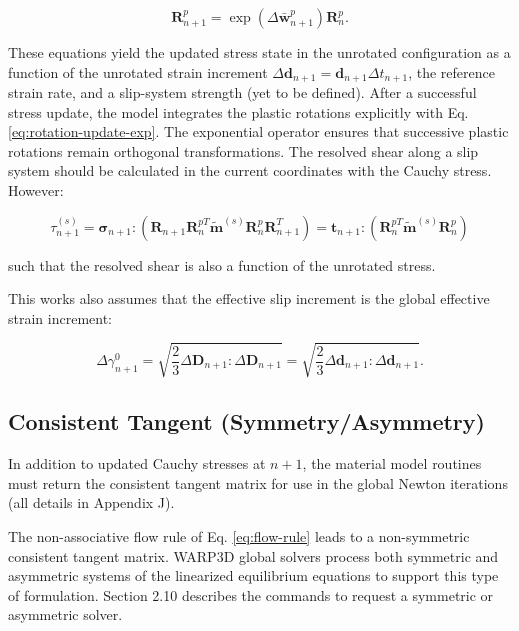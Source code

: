 \documentclass[11pt]{report}
\numberwithin{equation}{section}
\newcommand{\noi}{\noindent}
\newcommand{\eedit}{\color{black}}
\begin{document}
\begin{equation}
\mathbf{R}_{n+1}^{p}=\exp\left(\Delta\bar{\mathbf{w}}_{n+1}^{p}\right)\mathbf{R}_{n}^{p}.\label{eq:rotation-update-exp}
\end{equation}

These equations yield the updated stress state in the unrotated configuration
as a function of the unrotated strain increment 
$\Delta\mathbf{d}_{n+1}=\mathbf{d}_{n+1}\Delta t_{n+1}$,
the reference strain rate, and a slip-system strength (yet to be defined).
After a successful stress update, the model integrates the plastic
rotations explicitly with Eq. \ref{eq:rotation-update-exp}.
The exponential
operator ensures that successive plastic rotations remain orthogonal
transformations.
The resolved shear along a slip system should be
calculated in the current coordinates with the Cauchy stress. 
However:

\[
\tau_{n+1}^{\left(s\right)}=
\bm{\sigma}_{n+1}:\left(\mathbf{R}_{n+1}\mathbf{R}_{n}^{pT}
\tilde{\mathbf{m}}^{\left(s\right)}\mathbf{R}_{n}^{p}\mathbf{R}_{n+1}^{T}\right)=
\mathbf{t}_{n+1}:\left(\mathbf{R}_{n}^{pT}\tilde{\mathbf{m}}^{\left(s\right)}\mathbf{R}_{n}^{p}\right)
\]

\noi such that the resolved shear is also a function of the unrotated stress.

This works also assumes that the effective slip increment is the global effective
strain increment:

\begin{equation}
\Delta\gamma_{n+1}^{0}=
\sqrt{\frac{2}{3}\Delta\mathbf{D}_{n+1}:\Delta\mathbf{D}_{n+1}}=
\sqrt{\frac{2}{3}\Delta\mathbf{d}_{n+1}:\Delta\mathbf{d}_{n+1}}.\label{eq:reference-slip}
\end{equation}
\eedit

\subsection {Consistent Tangent (Symmetry/Asymmetry)}
In addition to updated Cauchy stresses at $n+1$, 
the material model routines must return the 
consistent tangent matrix for use in the global Newton iterations (all details in Appendix J).  

The non-associative  flow rule of Eq. \ref{eq:flow-rule} leads to 
a non-symmetric consistent tangent matrix.  WARP3D global solvers process both
symmetric and asymmetric systems of the linearized equilibrium
equations to support this type of formulation. Section 2.10 describes the commands to 
request a symmetric or asymmetric solver.
\end{document}
